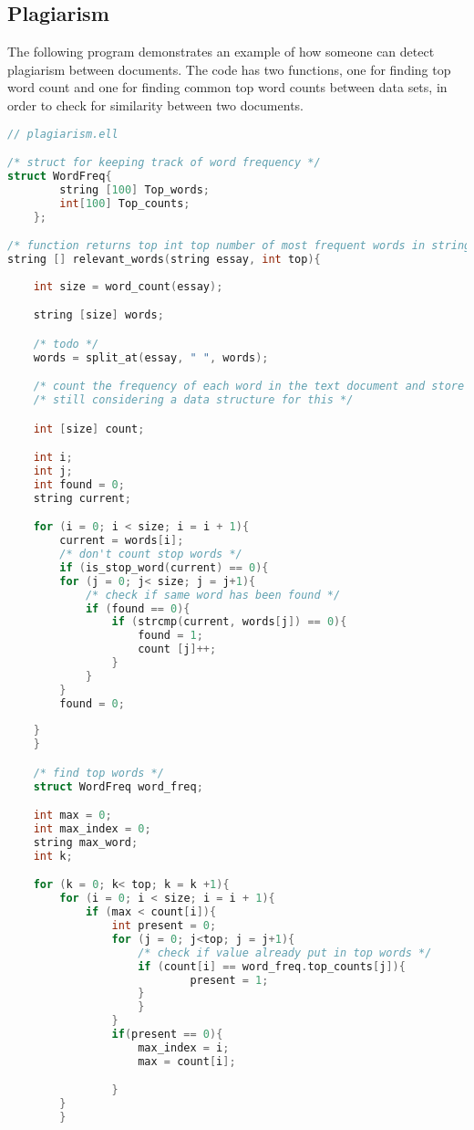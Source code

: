 \documentclass{article}
\begin{document}
\subsection{Plagiarism}
The following program demonstrates an example of how someone can detect plagiarism between documents. The code has two functions, one for finding top word count and one for finding common top word counts between data sets, in order to check for similarity between two documents.
\begin{lstlisting}[language=C]
// plagiarism.ell

/* struct for keeping track of word frequency */
struct WordFreq{
	    string [100] Top_words;
	    int[100] Top_counts;
	};

/* function returns top int top number of most frequent words in string, exclusing common stop words */
string [] relevant_words(string essay, int top){
	
	int size = word_count(essay);

	string [size] words; 

	/* todo */
	words = split_at(essay, " ", words);

	/* count the frequency of each word in the text document and store in count */
	/* still considering a data structure for this */

	int [size] count;

	int i;
	int j;
	int found = 0;
	string current;

	for (i = 0; i < size; i = i + 1){
		current = words[i]; 
		/* don't count stop words */
		if (is_stop_word(current) == 0){
		for (j = 0; j< size; j = j+1){
		    /* check if same word has been found */
			if (found == 0){
	    		if (strcmp(current, words[j]) == 0){ 
	    			found = 1;
	    			count [j]++;
	    		}
			}
		}
		found = 0;
	
	}
	}

	/* find top words */
	struct WordFreq word_freq;

	int max = 0;
	int max_index = 0; 
	string max_word;
	int k;

	for (k = 0; k< top; k = k +1){
		for (i = 0; i < size; i = i + 1){
			if (max < count[i]){
				int present = 0;
				for (j = 0; j<top; j = j+1){ 
					/* check if value already put in top words */
					if (count[i] == word_freq.top_counts[j]){	    					if (string_compare(words[i] == word_freq.top_words[j])){
							present = 1;
					}
					}
				}
				if(present == 0){ 
					max_index = i;
					max = count[i];

				}
		}
		}


\end{lstlisting}
\end{document}
